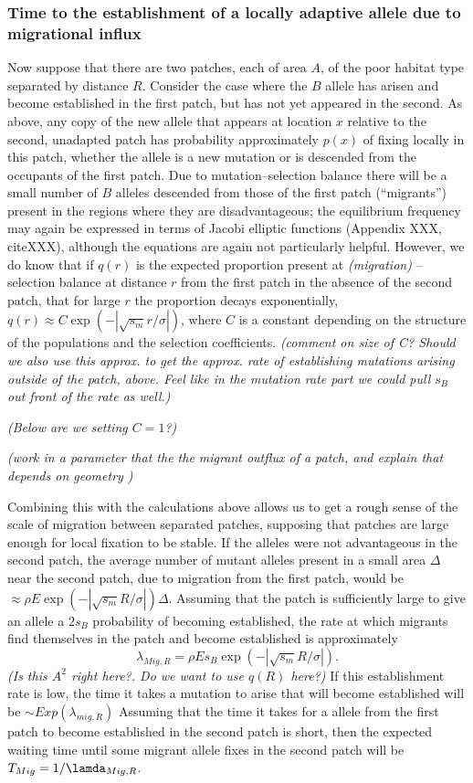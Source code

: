 \documentclass{article}
\newcommand{\gc}[1]{{ \it \color{green} (#1) } }
\begin{document}
\subsubsection{Time to the establishment of a locally adaptive allele
  due to migrational influx}
\label{ss:patchymigration}
Now suppose that there are two patches, each of area $A$, of the poor
habitat type separated by distance $R$. Consider the case where the
$B$ allele has arisen and become established in the first patch, but has not yet appeared in the second.
As above, any copy of the new allele that appears at location $x$ relative to the second, unadapted patch 
has probability approximately $p(x)$ of fixing locally in this patch,
whether the allele is a new mutation or is descended from the occupants of the first patch.
Due to mutation--selection balance there will be a small number of $B$ alleles descended from those of the first patch (``migrants'') 
present in the regions where they are disadvantageous;
the equilibrium frequency may again be expressed in terms of Jacobi elliptic functions (Appendix XXX, citeXXX),
although the equations are again not particularly helpful.
However, we do know that if $q(r)$ is the expected proportion present at \gc{migration}--selection balance at distance $r$ from the first patch
in the absence of the second patch, that for large $r$ the proportion decays exponentially, $q(r) \approx C \exp( -|\sqrt{s_m} r / \sigma|)$,
where $C$ is a constant depending on the structure of the populations
and the selection coefficients. \gc{comment on size of C? Should we
  also use this approx. to get the approx. rate of establishing mutations
  arising outside of the patch, above. Feel like in the mutation rate
  part we could pull $s_B$ out front of the rate as well.} 

\gc{Below are we setting $C=1$?}

\gc{work in a parameter that the the migrant outflux of a patch, and
  explain that depends on geometry }

Combining this with the calculations above allows us to get a rough sense of the scale of migration between separated patches,
supposing that patches are large enough for local fixation to be stable. If the alleles were not advantageous in the second patch,
the average number of mutant alleles present in a small area $\Delta$
near the second patch, due
to migration from the first patch, would be $\approx \rho E \exp( -
|\sqrt{s_m} R/\sigma| ) \Delta$. Assuming that the patch is
sufficiently large to give an allele a $2s_B$ probability of becoming established, the rate at which migrants find
themselves in the patch and become established  is approximately
\begin{equation}
\lambda_{Mig,R} = \rho E s_B \exp( -|\sqrt{s_m} R/\sigma| ).
\end{equation}
\gc{Is this $A^2$ right here?. Do we want to use $q(R)$ here?}
If this establishment rate is low, the time it takes
a mutation to arise that will become established will be  $\sim Exp(\lambda_{mig,R})$
Assuming that the time it takes for a allele from the first patch to
become established in the second patch is short,
then  the expected waiting time until some migrant allele fixes in the
second patch will be $T_{Mig} = 1/\lamda_{Mig,R} $.
\end{document}

